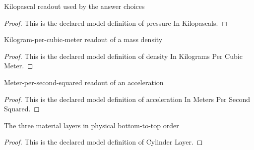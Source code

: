 \begin{definition}
  \label{def:physics:phyx-mini-0385:phyxminiproblems-problemphyxmini0385-pressureinkilopascals}
  Kilopascal readout used by the answer choices
\end{definition}
\begin{proof}
  This is the declared model definition of pressure In Kilopascals.
\end{proof}
\begin{definition}
  \label{def:physics:phyx-mini-0385:phyxminiproblems-problemphyxmini0385-densityinkilogramspercubicmeter}
  Kilogram-per-cubic-meter readout of a mass density
\end{definition}
\begin{proof}
  This is the declared model definition of density In Kilograms Per Cubic Meter.
\end{proof}
\begin{definition}
  \label{def:physics:phyx-mini-0385:phyxminiproblems-problemphyxmini0385-accelerationinmeterspersecondsquared}
  Meter-per-second-squared readout of an acceleration
\end{definition}
\begin{proof}
  This is the declared model definition of acceleration In Meters Per Second Squared.
\end{proof}
\begin{definition}
  \label{def:physics:phyx-mini-0385:phyxminiproblems-problemphyxmini0385-cylinderlayer}
  The three material layers in physical bottom-to-top order
\end{definition}
\begin{proof}
  This is the declared model definition of Cylinder Layer.
\end{proof}
